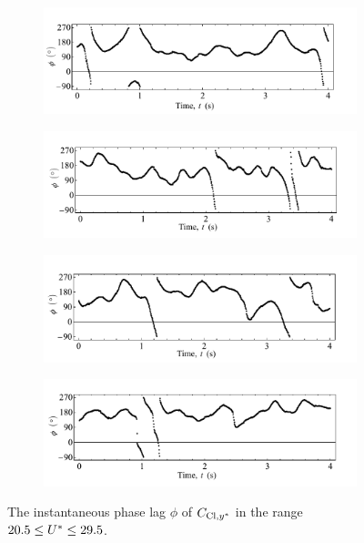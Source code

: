 \documentclass[oneside]{utmthesis}
\begin{document}
\begin{figure}
  \centering
  \begin{subfigure}[h]{1\textwidth}
    \includegraphics[width=\textwidth]{figs/phaseAngle-a}
    \caption{}
    \label{fig:phaseAngle-a}
  \end{subfigure}

  \begin{subfigure}[h]{1\textwidth}
    \includegraphics[width=\textwidth]{figs/phaseAngle-b}
    \caption{}
    \label{fig:phaseAngle-b}
  \end{subfigure}

  \begin{subfigure}[h]{1\textwidth}
    \includegraphics[width=\textwidth]{figs/phaseAngle-c}
    \caption{}
    \label{fig:phaseAngle-c}
  \end{subfigure}

  \begin{subfigure}[h]{1\textwidth}
    \includegraphics[width=\textwidth]{figs/phaseAngle-d}
    \caption{}
    \label{fig:phaseAngle-d}
  \end{subfigure}
  \caption{The instantaneous phase lag $\phi$ of $C_{\text{Cl},y^{*}}$ in the range $20.5 \leq U^{*} \leq 29.5$.}
\end{figure}
\end{document}
